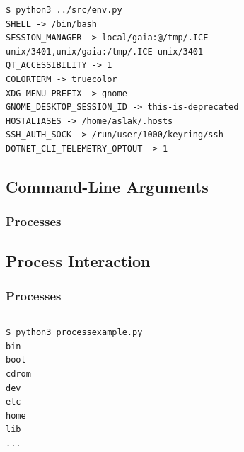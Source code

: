 {\begin{frame}[fragile]
  \inputminted[fontsize=\small]{python}{../src/env.py}
  
  \pause
  \vspace{5mm}
  \begin{verbatim}
$ python3 ../src/env.py
SHELL -> /bin/bash
SESSION_MANAGER -> local/gaia:@/tmp/.ICE-unix/3401,unix/gaia:/tmp/.ICE-unix/3401
QT_ACCESSIBILITY -> 1
COLORTERM -> truecolor
XDG_MENU_PREFIX -> gnome-
GNOME_DESKTOP_SESSION_ID -> this-is-deprecated
HOSTALIASES -> /home/aslak/.hosts
SSH_AUTH_SOCK -> /run/user/1000/keyring/ssh
DOTNET_CLI_TELEMETRY_OPTOUT -> 1
  \end{verbatim}
\end{frame}

\subsection{Command-Line Arguments}
\begin{frame}
    \frametitle{Processes }
    \vspace{3mm}
    \contentCLA
\end{frame}

\subsection{Process Interaction}
\begin{frame}[fragile]
  \frametitle{Processes }
  \vspace{0mm}
  \inputminted[fontsize=\footnotesize]{python}{../src/processexample.py}
  \pause
  \vspace{5mm}
  {\footnotesize
  \begin{verbatim}
$ python3 processexample.py
bin
boot
cdrom
dev
etc
home
lib
...
  \end{verbatim}
  }
\end{frame}

}


